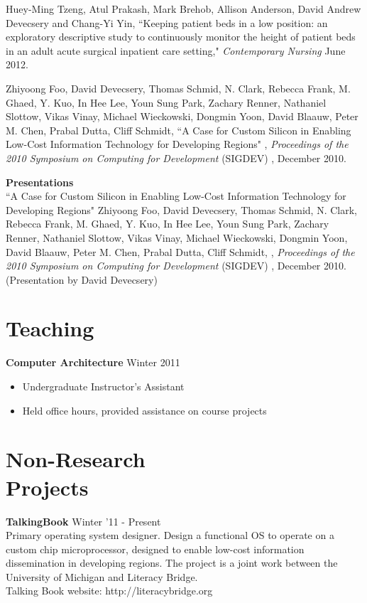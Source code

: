 \documentclass[margin, 10pt]{res} %
\begin{document}
\begin{resume}
Huey-Ming Tzeng, Atul Prakash, Mark Brehob, Allison Anderson, David
Andrew Devecsery and Chang-Yi Yin, ``Keeping patient beds in a low
position: an exploratory descriptive study to continuously monitor the
height of patient beds in an adult acute surgical inpatient care
setting," {\sl Contemporary Nursing} June 2012.

Zhiyoong Foo, David Devecsery, Thomas Schmid, N. Clark, Rebecca Frank,
M. Ghaed, Y. Kuo, In Hee Lee, Youn Sung Park, Zachary Renner,
Nathaniel Slottow, Vikas Vinay, Michael Wieckowski, Dongmin Yoon,
David Blaauw, Peter M. Chen, Prabal Dutta, Cliff Schmidt, ``A Case for
Custom Silicon in Enabling Low-Cost Information Technology for
Developing Regions" , {\sl Proceedings of the 2010 Symposium on Computing
for Development} (SIGDEV) , December 2010.

\textbf{Presentations}\\
``A Case for Custom Silicon in Enabling Low-Cost Information
Technology for Developing Regions" Zhiyoong Foo, David Devecsery,
Thomas Schmid, N. Clark, Rebecca Frank, M. Ghaed, Y. Kuo, In Hee Lee,
Youn Sung Park, Zachary Renner, Nathaniel Slottow, Vikas Vinay,
Michael Wieckowski, Dongmin Yoon, David Blaauw, Peter M. Chen, Prabal
Dutta, Cliff Schmidt,  , {\sl Proceedings of the 2010 Symposium on
Computing for Development} (SIGDEV) , December 2010. (Presentation by
David Devecsery)

\section{Teaching}
\textbf{Computer Architecture} \hfill Winter 2011
\begin{itemize}
	\item Undergraduate Instructor's Assistant
	\item Held office hours, provided assistance on course projects
\end{itemize}

\section{Non-Research \\ Projects}
\textbf{TalkingBook} \hfill Winter '11 - Present \\
Primary operating system designer.  Design a functional OS to operate
on a custom chip microprocessor, designed to enable low-cost
information dissemination in developing regions.  The project is a
joint work between the University of Michigan and Literacy Bridge. \\
Talking Book website: http://literacybridge.org


\end{resume}
\end{document}
